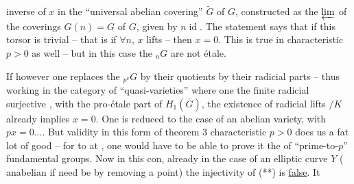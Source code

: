inverse of $x$ in the ``universal abelian covering'' $\widetilde G$ of $G$, constructed as the $\varprojlim$ of the coverings $G(n)=G$ of $G$, given by $n\operatorname{id}$. The statement says that if this torsor is trivial -- that is if $\forall n$, $x$ lifts -- then $x=0$. This is true in characteristic $p>0$ as well -- but in this case the ${}_nG$ are not étale.


If however one replaces the ${}_{p^\nu}G$ by their quotients by their radicial parts -- thus working in the category of ``quasi-varieties'' where one   the finite radicial surjective  ,   with the pro-étale part of $H_1(\overline G)$,  the existence of radicial lifts $/K$ already implies $x=0$.  One is reduced to the case of an abelian variety, with $px=0$.... But  validity in this form of theorem 3   characteristic $p>0$ does us a fat lot of good -- for to  at , one would have to be able to prove it   the  of ``prime-to-$p$'' fundamental groups. Now in this con, already in the case of an elliptic curve $Y$ (  anabelian if need be by removing a point) the injectivity of (**) is \uline{false}. It

